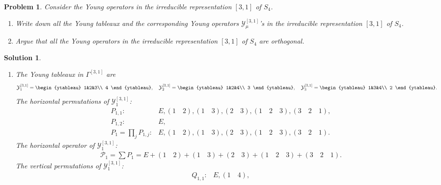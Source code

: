 \documentclass[UTF8,10pt,a4paper]{article}
\theoremstyle{Problem}
\newtheorem{prob}{Problem}
\theoremstyle{Solution}
\newtheorem*{sol}{Solution}
\begin{document}
\begin{prob}
    Consider the Young operators in the irreducible representation $[3,1]$ of $S_4$.
    \begin{enumerate}
        \item[(a)] Write down all the Young tableaux and the corresponding Young operators $\mathcal{Y}_{\mu}^{[3,1]}$'s in the irreducible representation $[3,1]$ of $S_4$.
        \item[(b)] Argue that all the Young operators in the irreducible representation $[3,1]$ of $S_4$ are orthogonal.
    \end{enumerate}
\end{prob}
\begin{sol}
    \begin{enumerate}
        \item[(a)] The Young tableaux in $\Gamma^{[3,1]}$ are
        \[
            \mathcal{Y}_1^{[3,1]}=\begin{ytableau}
                1&2&3\\
                4
            \end{ytableau},\quad
            \mathcal{Y}_2^{[3,1]}=\begin{ytableau}
                1&2&4\\
                3
            \end{ytableau},\quad
            \mathcal{Y}_3^{[3,1]}=\begin{ytableau}
                1&3&4\\
                2
            \end{ytableau}.
        \]
        The horizontal permutations of $\mathcal{Y}_1^{[3,1]}$:
        \begin{align}
            P_{1,1}:&E,(1\quad 2),(1\quad 3),(2\quad 3),(1\quad 2\quad 3),(3\quad 2\quad 1),\\
            P_{1,2}:&E,\\
            P_1=\prod_jP_{1,j}:&E,(1\quad 2),(1\quad 3),(2\quad 3),(1\quad 2\quad 3),(3\quad 2\quad 1).
        \end{align}
        The horizontal operator of $\mathcal{Y}_1^{[3,1]}$:
        \begin{align}
            \mathcal{P}_1=\sum P_1=E+(1\quad 2)+(1\quad 3)+(2\quad 3)+(1\quad 2\quad 3)+(3\quad 2\quad 1).
        \end{align}
        The vertical permutations of $\mathcal{Y}_1^{[3,1]}$:
        \begin{align}
            Q_{1,1}:&E,(1\quad 4),\\

\end{align}
\end{enumerate}
\end{sol}
\end{document}

